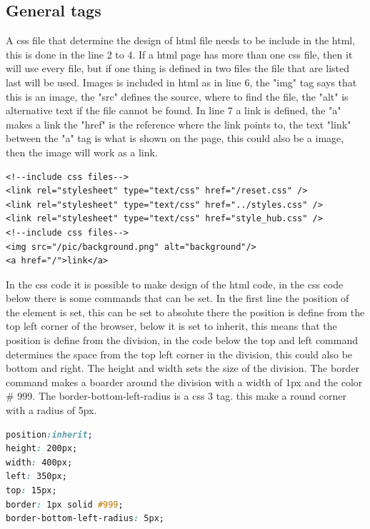 \subsection{General tags}
A css file that determine the design of html file needs to be include in the html, this is done in the line 2 to 4. If a html page has more than one css file, then it will use every file, but if one thing is defined in two files the file that are listed last will be used. Images is included in html as in line 6, the "img" tag says that this is an image, the "src" defines the source, where to find the file, the "alt" is alternative text if the file cannot be found. In line 7 a link is defined, the "a" makes a link the "href" is the reference where the link points to, the text "link" between the "a" tag is what is shown on the page, this could also be a image, then the image will work as a link.
\begin{lstlisting}
<!--include css files-->
<link rel="stylesheet" type="text/css" href="/reset.css" />
<link rel="stylesheet" type="text/css" href="../styles.css" />
<link rel="stylesheet" type="text/css" href="style_hub.css" />
<!--include css files-->
<img src="/pic/background.png" alt="background"/>
<a href="/">link</a>
\end{lstlisting}
In the css code it is possible to make design of the html code, in the css code below there is some commands that can be set. In the first line the position of the element is set, this can be set to absolute there the position is define from the top left corner of the browser, below it is set to inherit, this means that the position is define from the division, in the code below the top and left command determines the space from the top left corner in the division, this could also be bottom and right. The height and width sets the size of the division. The border command makes a boarder around the division with a width of 1px and the color \# 999. The border-bottom-left-radius is a css 3 tag. this make a round corner with a radius of 5px.
\begin{lstlisting}[language=CSS]
position:inherit;
height: 200px;
width: 400px;
left: 350px;
top: 15px;
border: 1px solid #999;
border-bottom-left-radius: 5px;
\end{lstlisting}